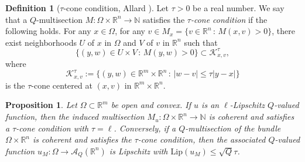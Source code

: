 \documentclass[a4paper,11pt,reqno]{amsart}
\newtheorem{proposition}[theorem]{Proposition}
\theoremstyle{definition}
\newtheorem{definition}[theorem]{Definition}
\numberwithin{equation}{section}
\numberwithin{subsection}{section}
\newcommand{\N}{\mathbb{N}}
\newcommand{\R}{\mathbb{R}}
\newcommand{\A}{\mathcal{A}}
\newcommand{\K}{\mathcal{K}}
\newcommand{\Lip}{\mathrm{Lip}}
\begin{document}
\begin{definition}[$\tau$-cone condition, Allard {\cite{Allard}}] \label{cone}
Let $\tau > 0$ be a real number. We say that a $Q$-multisection $M \colon \Omega \times \R^{n} \to \N$ satisfies the $\tau$\emph{-cone condition} if the following holds. For any $x \in \Omega$, for any $v \in M_{x} = \{ v \in \R^{n} \, \colon \, M(x,v) > 0 \}$, there exist neighborhoods $U$ of $x$ in $\Omega$ and $V$ of $v$ in $\R^{n}$ such that
\begin{equation} \label{cone:eq}
\{ (y,w) \in U \times V \, \colon \, M(y,w) > 0 \} \subset \K^{\tau}_{x,v},
\end{equation}
where
\begin{equation} \label{cone:def}
\K^{\tau}_{x,v} := \{ (y,w) \in \R^{m} \times \R^{n} \, \colon \, |w - v| \leq \tau |y - x| \}
\end{equation}
is the $\tau$-cone centered at $(x,v)$ in $\R^{m} \times \R^{n}$. 
\end{definition}

\begin{proposition} \label{Lip:prop}
Let $\Omega \subset \R^{m}$ be open and convex. If $u$ is an $\ell$-Lipschitz $Q$-valued function, then the induced multisection $M_{u} \colon \Omega \times \R^{n} \to \N$ is coherent and satisfies a $\tau$-cone condition with $\tau = \ell$. Conversely, if a $Q$-multisection of the bundle $\Omega \times \R^{n}$ is coherent and satisfies the $\tau$-cone condition, then the associated $Q$-valued function $u_{M} \colon \Omega \to \A_{Q}(\R^{n})$ is Lipschitz with $\Lip(u_{M}) \leq \sqrt{Q} \tau$. 
\end{proposition}
\end{document}
